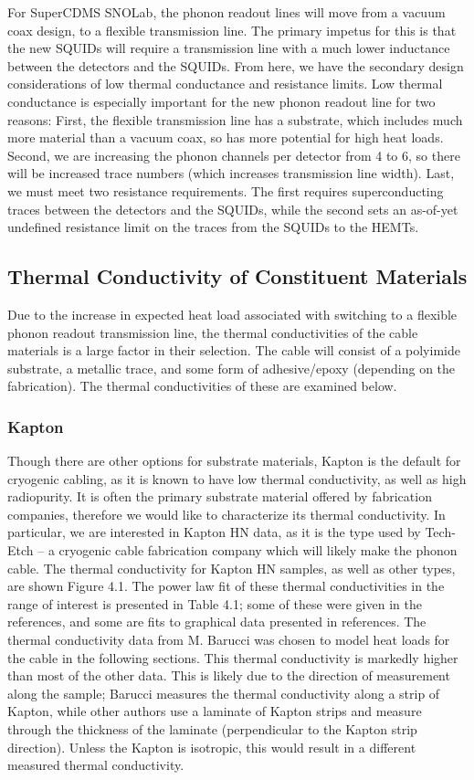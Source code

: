\documentclass{report}
\begin{document}
For SuperCDMS SNOLab, the phonon readout lines will move from a vacuum coax design, to a flexible transmission line. The primary impetus for this is that the new SQUIDs will require a transmission line with a much lower inductance between the detectors and the SQUIDs. From here, we have the secondary design considerations of low thermal conductance and resistance limits. Low thermal conductance is especially important for the new phonon readout line for two reasons: First, the flexible transmission line has a substrate, which includes much more material than a vacuum coax, so has more potential for high heat loads. Second, we are increasing the phonon channels per detector from 4 to 6, so there will be increased trace numbers (which increases transmission line width). Last, we must meet two resistance requirements. The first requires superconducting traces between the detectors and the SQUIDs, while the second sets an as-of-yet undefined resistance limit on the traces from the SQUIDs to the HEMTs.

\subsection{Thermal Conductivity of Constituent Materials}

Due to the increase in expected heat load associated with switching to a flexible phonon readout transmission line, the thermal conductivities of the cable materials is a large factor in their selection. The cable will consist of a polyimide substrate, a metallic trace, and some form of adhesive/epoxy (depending on the fabrication). The thermal conductivities of these are examined below.

\subsubsection{Kapton}

Though there are other options for substrate materials, Kapton is the default for cryogenic cabling, as it is known to have low thermal conductivity, as well as high radiopurity. It is often the primary substrate material offered by fabrication companies, therefore we would like to characterize its thermal conductivity. In particular, we are interested in Kapton HN data, as it is the type used by Tech-Etch -- a cryogenic cable fabrication company which will likely make the phonon cable. The thermal conductivity for Kapton HN samples, as well as other types, are shown Figure 4.1. The power law fit of these thermal conductivities in the range of interest is presented in Table 4.1; some of these were given in the references, and some are fits to graphical data presented in references. The thermal conductivity data from M. Barucci \cite{bar} was chosen to model heat loads for the cable in the following sections. This thermal conductivity is markedly higher than most of the other data. This is likely due to the direction of measurement along the sample; Barucci measures the thermal conductivity along a strip of Kapton, while other authors use a laminate of Kapton strips and measure through the thickness of the laminate (perpendicular to the Kapton strip direction). Unless the Kapton is isotropic, this would result in a different measured thermal conductivity.
\end{document}
